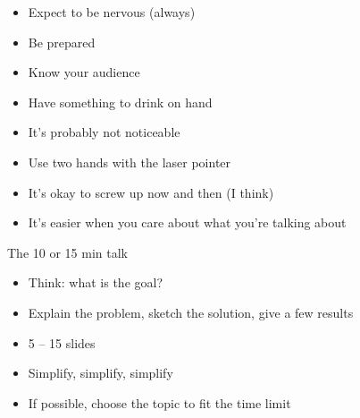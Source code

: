 \documentclass[12pt]{article}
\newcommand{\headsize}{\fontsize{35}{35} \selectfont}
\newcommand{\smallsize}{\fontsize{25}{30} \selectfont}
\newcommand{\smallersize}{\fontsize{20}{25} \selectfont}
\begin{document}
\hfill \begin{minipage}{9.5in}

\begin{itemize}
\itemsep18pt
\item Expect to be nervous {\color{myblue} \smallersize (always)}

\item Be prepared

\item Know your audience

\item Have something to drink on hand

\item It's probably not noticeable

\item Use two hands with the laser pointer

\item It's okay to screw up now and then {\color{myblue} \smallersize
    (I think)}

\item It's easier when you {\color{mypink} care} about what you're
  talking about

\end{itemize}

\end{minipage}





\newpage

\headsize \color{myyellow}
\hfill \begin{minipage}{5.75in}
\centering
The 10 or 15 min talk
\end{minipage}

\vspace{3cm} \color{mywhite} \smallsize

\hfill \begin{minipage}{9.5in}

\begin{itemize}
\itemsep18pt
\item Think: what {\color{mypink} is} the goal?

\item Explain the problem, sketch the solution, give a few results

\item 5 -- 15 slides

\item Simplify, simplify, simplify

\item If possible, choose the topic to fit the time limit

\end{itemize}

\end{minipage}
\end{document}
